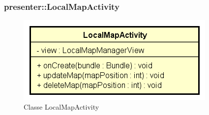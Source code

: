 \documentclass[../DefinizioneDiProdotto.tex]{subfiles}
\begin{document}
\subsubsection{presenter::LocalMapActivity}

    \begin{figure}[H]
        \centering
        \includegraphics{img/LocalMapActivity.png}
        \caption{Classe LocalMapActivity}\label{fig:presenter::LocalMapActivity} 
    \end{figure}
\end{document}
